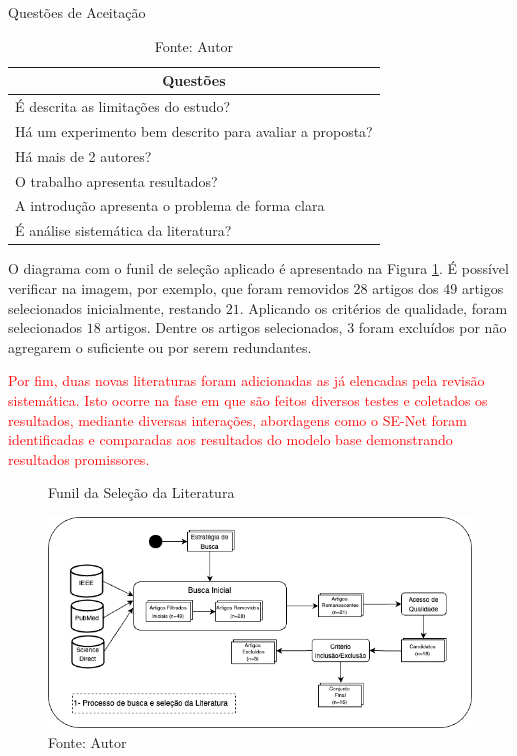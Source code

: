 \begin{table}[hbtp]
    \centering
    \caption{Questões de Aceitação}
    \renewcommand{\arraystretch}{1.4} %
    \begin{tabular}{|l|}
    \hline 
          \multicolumn{1}{|c|}{\textbf{Questões}} \\ 
    \hline 
        \quad É descrita as limitações do estudo? \\
        \quad Há um experimento bem descrito para avaliar a proposta? \\
        \quad Há mais de 2 autores? \\
        \quad O trabalho apresenta resultados? \\
        \quad A introdução apresenta o problema de forma clara \\
        \quad É análise sistemática da literatura? \\
    \hline 
    \end{tabular} 
    \caption*{Fonte: Autor}
    \label{tab:questoes}
\end{table}

O diagrama com o funil de seleção aplicado é apresentado na Figura \ref{fig:fig021}. É possível verificar na imagem, por exemplo, que foram removidos $28$ artigos dos $49$ artigos selecionados inicialmente, restando $21$. Aplicando os critérios de qualidade, foram selecionados $18$ artigos. Dentre os artigos selecionados, $3$ foram excluídos por não agregarem o suficiente ou por serem redundantes.

\textcolor{red}{
Por fim, duas novas literaturas foram adicionadas as já elencadas pela revisão sistemática. Isto ocorre na fase em que são feitos diversos testes e coletados os resultados, mediante diversas interações, abordagens como o \gls{SE-Net} foram identificadas e comparadas aos resultados do modelo base demonstrando resultados promissores.
}

\begin{figure}[h!]
    \centering
    \caption{Funil da Seleção da Literatura}
    \includegraphics[width=1\textwidth]{figures/fig021.png}
    \caption*{Fonte: Autor}
    \label{fig:fig021}
\end{figure}
